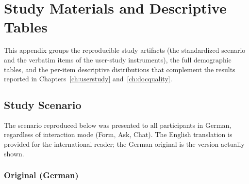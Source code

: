 \chapter{Study Materials and Descriptive Tables}
\label{app:materials-descriptives}

This appendix groups the reproducible study artifacts (the
standardized scenario and the verbatim items of the user-study
instruments), the full demographic tables, and the per-item
descriptive distributions that complement the results reported
in Chapters~\ref{ch:userstudy} and~\ref{ch:docquality}.

\section{Study Scenario}
\label{app:scenario}

The scenario reproduced below was presented to all participants
in German, regardless of interaction mode (Form, Ask, Chat). The
English translation is provided for the international reader; the
German original is the version actually shown.

\subsection{Original (German)}
\label{app:scenario-de}

